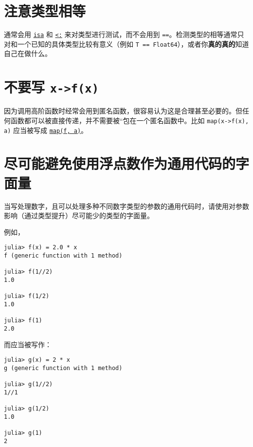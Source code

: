 \section{注意类型相等}



通常会用 \hyperlink{7066325108767373297}{\texttt{isa}} 和 \hyperlink{6254591906563366276}{\texttt{<:}} 来对类型进行测试，而不会用到 \texttt{==}。检测类型的相等通常只对和一个已知的具体类型比较有意义（例如 \texttt{T == Float64}），或者你\textbf{真的真的}知道自己在做什么。



\hypertarget{20919813611265277}{}


\section{不要写 \texttt{x->f(x)}}



因为调用高阶函数时经常会用到匿名函数，很容易认为这是合理甚至必要的。但任何函数都可以被直接传递，并不需要被“包{\textquotedbl}在一个匿名函数中。比如 \texttt{map(x->f(x), a)} 应当被写成 \hyperlink{11483231213869150535}{\texttt{map(f, a)}}。



\hypertarget{12032676153757060243}{}


\section{尽可能避免使用浮点数作为通用代码的字面量}



当写处理数字，且可以处理多种不同数字类型的参数的通用代码时，请使用对参数影响（通过类型提升）尽可能少的类型的字面量。



例如，




\begin{verbatim}
julia> f(x) = 2.0 * x
f (generic function with 1 method)

julia> f(1//2)
1.0

julia> f(1/2)
1.0

julia> f(1)
2.0
\end{verbatim}



而应当被写作：




\begin{verbatim}
julia> g(x) = 2 * x
g (generic function with 1 method)

julia> g(1//2)
1//1

julia> g(1/2)
1.0

julia> g(1)
2
\end{verbatim}



